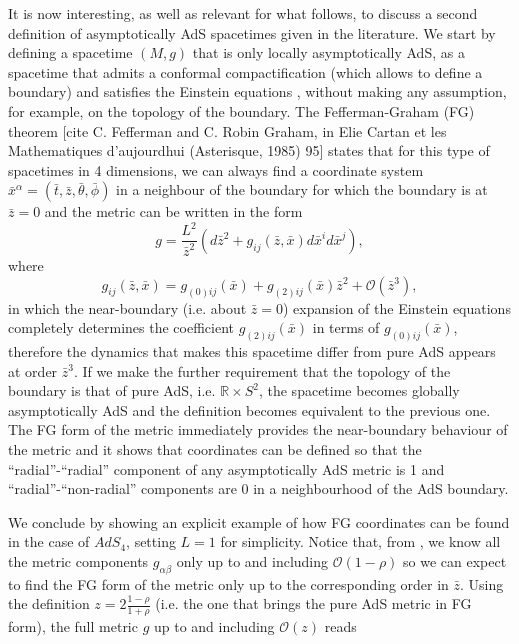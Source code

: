 \documentclass[12pt]{iopart} %
\begin{document}
It is now interesting, as well as relevant for what follows, to discuss a second definition of asymptotically AdS spacetimes given in the literature. We start by defining a spacetime $(M,g)$  that is only locally asymptotically AdS, as a spacetime that admits a conformal compactification (which allows to define a boundary) and satisfies the Einstein equations , without making any assumption, for example, on the topology of the boundary. The Fefferman-Graham (FG) theorem [cite C. Fefferman and C. Robin Graham, in Elie Cartan et les Mathematiques d’aujourdhui
(Asterisque, 1985) 95] states that for this type of spacetimes in 4 dimensions, we can always find a coordinate system $\bar{x}^\alpha=(\bar{t},\bar{z},\bar{\theta},\bar{\phi})$ in a neighbour of the boundary for which the boundary is at $\bar{z}=0$ and the metric can be written in the form
\begin{equation}
\label{eqn:FGmetric}
g=\frac{L^2}{\bar{z}^2}(d\bar{z}^2+g_{ij}(\bar{z},\bar{x})d\bar{x}^id\bar{x}^j),
\end{equation}
where 
\begin{equation}
\label{eqn:FGbdymetric}
g_{ij}(\bar{z},\bar{x})=g_{(0)ij}(\bar{x})+g_{(2)ij}(\bar{x})\bar{z}^2+\mathcal{O}(\bar{z}^3),
\end{equation}
in which the near-boundary (i.e. about $\bar{z}=0$) expansion of the Einstein equations completely determines the coefficient $g_{(2)ij}(\bar{x})$ in terms of $g_{(0)ij}(\bar{x})$, therefore the dynamics that makes this spacetime differ from pure AdS appears at order $\bar{z}^3$. If we make the further requirement that the topology of the boundary is that of pure AdS, i.e. $\mathbb{R}\times S^2$, the spacetime becomes globally asymptotically AdS and the definition becomes equivalent to the previous one. The FG form of the metric immediately provides the near-boundary behaviour of the metric and it shows that coordinates can be defined so that the ``radial''-``radial'' component of any asymptotically AdS metric is 1 and ``radial''-``non-radial'' components are 0 in a neighbourhood of the AdS boundary.

We conclude by showing an explicit example of how FG coordinates can be found in the case of $AdS_4$, setting $L=1$ for simplicity. Notice that, from  , we know all the metric components $g_{\alpha\beta}$ only up to and including $\mathcal{O}(1-\rho)$ so we can expect to find the FG form of the metric only up to the corresponding order in $\bar{z}$.
Using the definition $z=2\frac{1-\rho}{1+\rho}$ (i.e. the one that brings the pure AdS metric in FG form), the full metric $g$ up to and including $\mathcal{O}(z)$ reads
\end{document}
